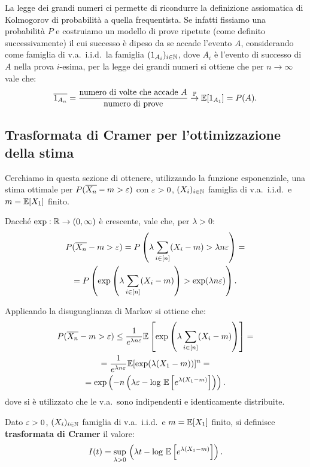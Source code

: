 \begin{multicols*}{2}
\begin{remark}
    La legge dei grandi numeri ci permette di ricondurre la definizione
    assiomatica di Kolmogorov di probabilità a quella frequentista. Se
    infatti fissiamo una probabilità $P$ e costruiamo un modello di prove
    ripetute (come definito successivamente) il cui successo è dipeso
    da se accade l'evento $A$, considerando come famiglia di
    v.a.~i.i.d.~la famiglia $(1_{A_i})_{i \in \mathbb{N}}$, dove $A_i$ è l'evento di successo di $A$ nella prova
    $i$-esima, per la legge dei grandi numeri si ottiene che per $n \to \infty$ vale che:
    \[
        \overline{1_{A_n}} = \frac{\text{numero di volte che accade $A$}}{\text{numero di prove}} \overset{\mathbb{P}}{\to} \mathbb{E}[1_{A_1}] = P(A).
    \]
\end{remark}

\subsection{Trasformata di Cramer per l'ottimizzazione della stima}

Cerchiamo in questa sezione di ottenere, utilizzando la funzione
esponenziale, una stima ottimale per
$P(\overline{X_n} - m > \varepsilon)$ con $\varepsilon > 0$, $(X_i)_{i \in \mathbb{N}}$ famiglia
di v.a.~i.i.d.~e $m = \mathbb{E}[X_1]$ finito. \smallskip

Dacché $\exp : \mathbb{R} \to (0, \infty)$ è crescente, vale che, per $\lambda > 0$:
\begin{multline*}
    P(\overline{X_n} - m > \varepsilon) = P\left(\lambda \sum_{i \in [n]} (X_i - m) > \lambda n \varepsilon\right) = \\ = P\left(\exp\left(\lambda \sum_{i \in [n]} (X_i - m)\right) > \exp(\lambda n \varepsilon)\right).
\end{multline*}

Applicando la disuguaglianza di Markov si ottiene che:
\begin{multline*}
    P(\overline{X_n} - m > \varepsilon) \leq \frac{1}{e^{\lambda n \varepsilon}} \mathbb{E}\left[\exp\left(\lambda \sum_{i \in [n]} (X_i - m)\right)\right] = \\
    = \frac{1}{e^{\lambda n \varepsilon}} \mathbb{E}[\exp(\lambda(X_1 - m))]^n = \\
    = \exp\left(-n\left(\lambda \varepsilon - \log \, \mathbb{E}\left[e^{\lambda(X_1-m)}\right]\right)\right).
\end{multline*}
dove si è utilizzato che le v.a.~sono indipendenti e identicamente distribuite.

\begin{definition}
    Dato $\varepsilon > 0$, $(X_i)_{i \in \mathbb{N}}$ famiglia
di v.a.~i.i.d.~e $m = \mathbb{E}[X_1]$ finito, si definisce \textbf{trasformata di Cramer}
    il valore:
    \[
        I(t) = \sup_{\lambda > 0} \, \left(\lambda t - \log \, \mathbb{E}\left[e^{\lambda(X_1-m)}\right]\right).
    \]
\end{definition}


\end{multicols*}

